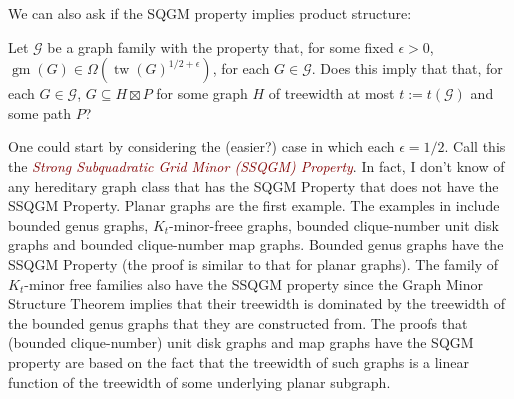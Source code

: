 \documentclass{patmorin}
\newcommand{\defin}[1]{\textcolor{Maroon}{\emph{#1}}}
\DeclareMathOperator{\tw}{tw}
\DeclareMathOperator{\gm}{gm}
\begin{document}
%
%
%
%
%




We can also ask if the SQGM property implies product structure:

\begin{op}
  Let $\mathcal{G}$ be a graph family with the property that, for some fixed $\epsilon >0$, $\gm(G)\in\Omega(\tw(G)^{1/2+\epsilon})$, for each $G\in\mathcal{G}$.  Does this imply that that, for each $G\in\mathcal{G}$, $G\subseteq H\boxtimes P$ for some graph $H$ of treewidth at most $t:=t(\mathcal{G})$ and some path $P$?
\end{op}

One could start by considering the (easier?) case in which each $\epsilon = 1/2$.  Call this the \defin{Strong Subquadratic Grid Minor (SSQGM) Property}.  In fact, I don't know of any hereditary graph class that has the SQGM Property that does not have the SSQGM Property.  Planar graphs are the first example. The examples in \cite{fomin.lokshtanov.ea:excluded} include bounded genus graphs, $K_t$-minor-freee graphs, bounded clique-number unit disk graphs and bounded clique-number map graphs. Bounded genus graphs have the SSQGM Property (the proof is similar to that for planar graphs).  The family of $K_t$-minor free families also have the SSQGM property since the Graph Minor Structure Theorem implies that their treewidth is dominated by the treewidth of the bounded genus graphs that they are constructed from.  The proofs that (bounded clique-number) unit disk graphs and map graphs have the SQGM property are based on the fact that the treewidth of such graphs is a linear function of the treewidth of some underlying planar subgraph.
\end{document}
